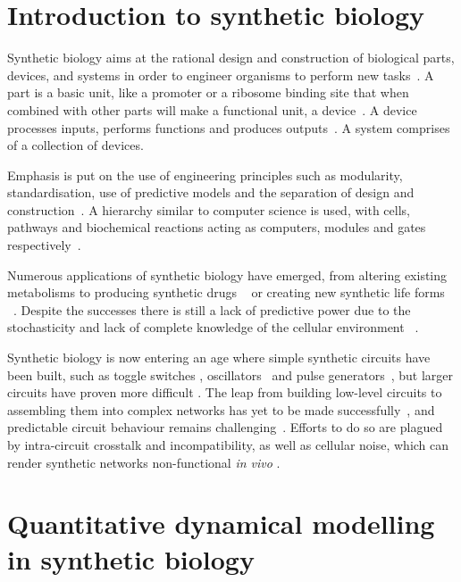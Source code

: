 

\section{Introduction to synthetic biology}

Synthetic biology aims at the rational design and construction of biological parts, devices, and systems in order to engineer organisms to perform new tasks~\autocite{Lu:2009ez, Andrianantoandro:2006bia}. A part is a basic unit, like a promoter or a ribosome binding site that when combined with other parts will make a functional unit, a device~\autocite{Heinemann:2006ht}. A device processes inputs, performs functions and produces outputs~\autocite{Andrianantoandro:2006bia}. A system comprises of a collection of devices.     

Emphasis is put on the use of engineering principles such as modularity, standardisation, use of predictive models and the separation of design and construction~\autocite{Agapakis:2009bt, Heinemann:2006ht}. A hierarchy similar to computer science is used, with cells, pathways and biochemical reactions acting as computers, modules and gates respectively~\autocite{Andrianantoandro:2006bia}. 
       
Numerous applications of synthetic biology have emerged, from altering existing metabolisms to producing synthetic drugs ~\autocite{Holtz:2010bm} or creating new synthetic life forms ~\autocite{Agapakis:2009bt}. Despite the successes there is still a lack of predictive power due to the stochasticity and lack of complete knowledge of the cellular environment ~\autocite{Andrianantoandro:2006bia}.

Synthetic biology is now entering an age where simple synthetic circuits have been built, such as toggle switches \autocite{Gardner:2000vha, Kramer:2004kq, Isaacs:2003hta, Ham:2008hh, Deans:2007cy, Friedland:2009ce}, oscillators~\autocite{Stricker:2008jqa, Fung:2005jd, Tigges:2009jx} and pulse generators~\autocite{Basu:2004gn}, but larger circuits have proven more difficult \autocite{XXX}. The leap from building low-level circuits to assembling them into complex networks has yet to be made successfully~\autocite{Lu:2009ez}, and predictable circuit behaviour remains challenging~\autocite{XXX}. Efforts to do so are plagued by intra-circuit crosstalk and incompatibility, as well as cellular noise, which can render synthetic networks non-functional \textit{in vivo} \autocite{XXX}. 


\section{Quantitative dynamical modelling in synthetic biology}


